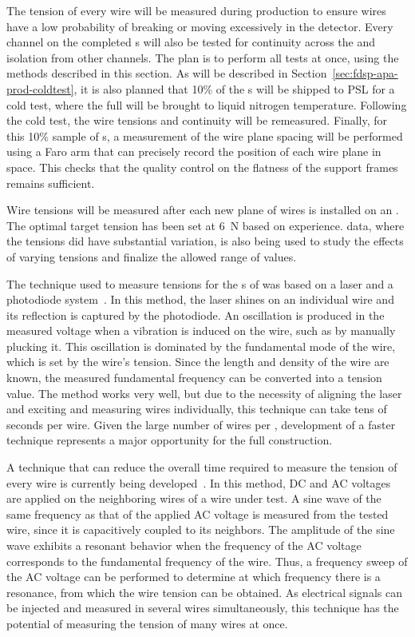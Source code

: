 The tension of every wire will be measured during production to ensure wires have a low probability of breaking or moving excessively in the detector.  Every channel on the completed s will also be tested for continuity across the  and isolation from other channels.  The plan is to perform all tests at once, using the methods described in this section.  As will be described in Section~\ref{sec:fdsp-apa-prod-coldtest}, it is also planned that 10$\%$ of the s will be shipped to PSL for a cold test, where the full  will be brought to liquid nitrogen temperature. Following the cold test, the wire tensions and continuity will be remeasured.  Finally, for this 10$\%$ sample of s, a measurement of the wire plane spacing will be performed using a Faro arm that can precisely record the position of each wire plane in space. This checks that the quality control on the flatness of the support frames remains sufficient.  

Wire tensions will be measured after each new plane of wires is installed on an . The optimal target tension has been set at \SI{6}{N} based on  experience.   data, where the tensions did have substantial variation, is also being used to study the effects of varying tensions and finalize the allowed range of values.  


The technique  
used to measure tensions for the s of  was based on a laser and a photodiode system~\cite{Acciarri:2016ugk}. In this method, the laser shines on an individual wire and its reflection is captured by the photodiode. An oscillation is produced in the measured voltage when a vibration is induced on the wire, such as by manually plucking it. This oscillation is dominated by the fundamental mode of the wire, which is set by the wire's tension. Since the length and density of the wire are known, the measured fundamental frequency can be converted into a tension value. The method works very well, but due to the necessity of aligning the laser and exciting and measuring wires individually, this technique can take tens of seconds per wire. Given the large number of wires per , development of a faster technique represents a major opportunity for the full  construction.

A technique that can reduce the overall time required to measure the tension of every wire is currently being developed~\cite{Garcia-Gamez:2018frz}. In this method, DC and AC voltages are applied on the neighboring wires of a wire under test. A sine wave of the same frequency as that of the applied AC voltage is measured from the tested wire, since it is capacitively coupled to its neighbors. The amplitude of the sine wave exhibits a resonant behavior when the frequency of the AC voltage corresponds to the fundamental frequency of the wire. Thus, a frequency sweep of the AC voltage can be performed to determine at which frequency there is a resonance, from which the wire tension can be obtained. As electrical signals can be injected and measured in several wires simultaneously, this technique has the potential of measuring the tension of many wires at once.

